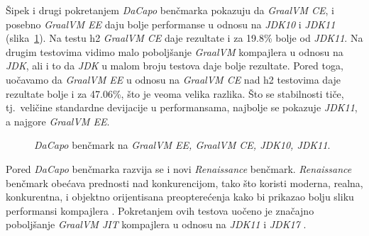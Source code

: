 \documentclass[a4paper]{article}
\begin{document}
Šipek i drugi \cite{vsipek19} pokretanjem \emph{DaCapo} benčmarka \cite{dacapo} pokazuju da \emph{GraalVM CE}, i posebno \emph{GraalVM EE} daju bolje performanse u odnosu na \emph{JDK10} i \emph{JDK11} (slika~\ref{fig:dacapo}). Na testu h2 \emph{GraalVM CE} daje rezultate i za 19.8\% bolje od \emph{JDK11}. Na drugim testovima vidimo malo poboljšanje \emph{GraalVM} kompajlera u odnosu na \emph{JDK}, ali i to da \emph{JDK} u malom broju testova daje bolje rezultate. Pored toga, uočavamo da \emph{GraalVM EE} u odnosu na \emph{GraalVM CE} nad h2 testovima daje rezultate bolje i za 47.06\%, što je veoma velika razlika. Što se stabilnosti tiče, tj.\ veličine standardne devijacije u performansama, najbolje se pokazuje \emph{JDK11}, a najgore \emph{GraalVM EE}.

\begin{figure}
\begin{center}
\end{center}
    \caption{\emph{DaCapo} benčmark na \emph{GraalVM EE, GraalVM CE, JDK10, JDK11}.}
\label{fig:dacapo}
\end{figure}

Pored \emph{DaCapo} benčmarka razvija se i novi \emph{Renaissance} benčmark. \emph{Renaissance} benčmark obećava prednosti nad konkurencijom, tako što koristi moderna, realna, konkurentna, i objektno orijentisana preopterećenja kako bi prikazao bolju sliku performansi kompajlera \cite{prokopec19}. Pokretanjem ovih testova uočeno je značajno poboljšanje \emph{GraalVM JIT} kompajlera u odnosu na \emph{JDK11} i \emph{JDK17} \cite{renaissance}.
\end{document}
